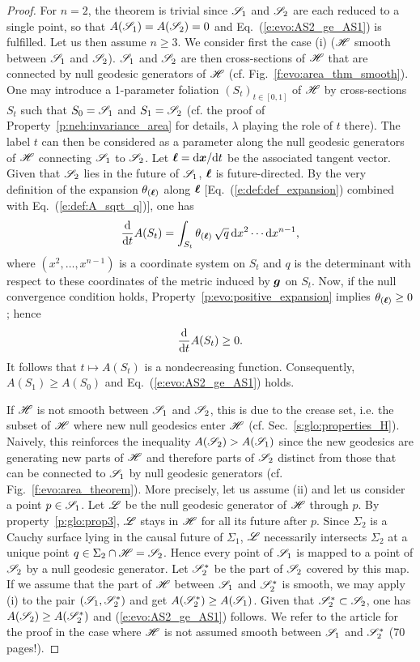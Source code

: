 \begin{proof}
For $n=2$, the theorem is trivial since $\mathscr{S}_1$ and $\mathscr{S}_2$ are each reduced to a
single point, so that $A(\mathscr{S}_1) = A(\mathscr{S}_2) = 0$ and Eq.~(\ref{e:evo:AS2_ge_AS1}) is fulfilled.
Let us then assume $n\geq 3$.
We consider first the case (i) ($\mathscr{H}$ smooth between
$\mathscr{S}_1$ and $\mathscr{S}_2$).
$\mathscr{S}_1$ and $\mathscr{S}_2$ are then cross-sections of $\mathscr{H}$
that are connected by null geodesic generators of $\mathscr{H}$
(cf. Fig.~\ref{f:evo:area_thm_smooth}).
One may introduce a 1-parameter foliation $(S_t)_{t\in [0,1]}$ of $\mathscr{H}$ by
cross-sections $S_t$ such that $S_0 = \mathscr{S}_1$ and $S_1 = \mathscr{S}_2$
(cf. the proof of Property~\ref{p:neh:invariance_area} for details, $\lambda$
playing the role of $t$ there). The label $t$
can then be considered as a parameter along the null geodesic generators of $\mathscr{H}$
connecting $\mathscr{S}_1$ to $\mathscr{S}_2$.
Let $\bm{\ell} = \mathrm{d}\bm{x}/\mathrm{d} t$ be the associated tangent vector.
Given that $\mathscr{S}_2$ lies in the future of $\mathscr{S}_1$, $\bm{\ell}$ is future-directed.
By the very definition
of the expansion $\theta_{(\bm{\ell})}$ along $\bm{\ell}$ [Eq.~(\ref{e:def:def_expansion})
combined with Eq.~(\ref{e:def:A_sqrt_q})], one has
\[
    \frac{\mathrm{d} }{\mathrm{d} t} A(S_t) = \int_{S_t} \theta_{(\bm{\ell})} \,  \sqrt{q} \, \mathrm{d} x^2 \cdots \mathrm{d} x^{n-1} ,
\]
where $(x^2, \ldots, x^{n-1})$ is a coordinate system on $S_t$ and $q$ is
the determinant with respect to these coordinates of the metric
induced by $\bm{g}$ on $S_t$.
Now, if the null convergence condition holds, Property~\ref{p:evo:positive_expansion} implies
$\theta_{(\bm{\ell})} \geq 0$; hence
\[
  \frac{\mathrm{d} }{\mathrm{d} t} A(S_t) \geq 0 .
\]
It follows that $t\mapsto A(S_t)$ is a nondecreasing function. Consequently, $A(S_1) \geq A(S_0)$
and Eq.~(\ref{e:evo:AS2_ge_AS1}) holds.

If $\mathscr{H}$ is not smooth between $\mathscr{S}_1$ and $\mathscr{S}_2$, this is due to the crease set,
i.e. the subset of $\mathscr{H}$ where new null geodesics enter $\mathscr{H}$ (cf. Sec.~\ref{s:glo:properties_H}).
Naively, this reinforces the inequality $A(\mathscr{S}_2) > A(\mathscr{S}_1)$ since the new geodesics
are generating new parts of $\mathscr{H}$ and therefore parts of $\mathscr{S}_2$ distinct
from those that can be connected to $\mathscr{S}_1$ by null geodesic generators
(cf. Fig.~\ref{f:evo:area_theorem}). More precisely, let us assume (ii) and
let us consider a point $p\in\mathscr{S}_1$. Let $\mathscr{L}$ be the null geodesic
generator of $\mathscr{H}$ through $p$. By property~\ref{p:glo:prop3}, $\mathscr{L}$ stays in $\mathscr{H}$ for all its future after $p$. Since $\Sigma_2$ is a Cauchy surface lying in the causal future of $\Sigma_1$, $\mathscr{L}$
necessarily intersects $\Sigma_2$ at a unique point $q \in \Sigma_2\cap\mathscr{H} = \mathscr{S}_2$.
Hence every point of $\mathscr{S}_1$ is mapped to a point of $\mathscr{S}_2$ by a null geodesic generator.
Let $\mathscr{S}_2^*$ be the part of $\mathscr{S}_2$ covered by this map.
If we assume that the part of $\mathscr{H}$ between $\mathscr{S}_1$ and $\mathscr{S}_2^*$ is smooth,
we may apply (i) to the pair $(\mathscr{S}_1, \mathscr{S}_2^*)$
and get $A(\mathscr{S}_2^*) \geq A(\mathscr{S}_1)$. Given that $\mathscr{S}_2^* \subset \mathscr{S}_2$, one has
$A(\mathscr{S}_2) \geq A(\mathscr{S}_2^*)$ and (\ref{e:evo:AS2_ge_AS1}) follows.
We refer to the article \cite{ChrusDGH01} for the proof in the case where
$\mathscr{H}$ is not assumed smooth between $\mathscr{S}_1$ and $\mathscr{S}_2^*$ (70 pages!).
\end{proof}


